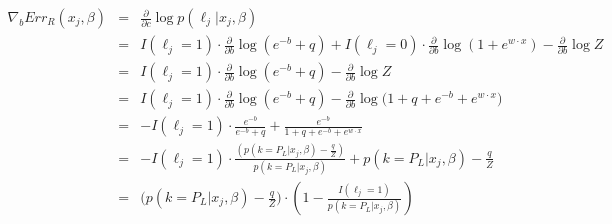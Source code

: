 \documentclass{article}
\begin{document}
\begin{eqnarray*}
\nabla_{b}{Err_R (x_j, \beta)} &=& \frac{\partial}{\partial c}\log{p(\ell_j | x_j, \beta)} \\
&=& I(\ell_j=1) \cdot \frac{\partial}{\partial b}
		\log{(e^{-b} + q)} +
    I(\ell_j=0) \cdot \frac{\partial}{\partial b}
		\log{ \left( 1 + e^{w \cdot x} \right) }
		- \frac{\partial}{\partial b}
		 \log{Z} \\
&=& I(\ell_j=1) \cdot \frac{\partial}{\partial b}
		\log{(e^{-b} + q)} -
		\frac{\partial}{\partial b}
		 \log{Z} \\
 &=& I(\ell_j=1) \cdot \frac{\partial}{\partial b}
		\log{  \left( e^{-b} + q \right) }
		- \frac{\partial}{\partial b}
		 \log{\bigg(
			1 + q + e^{-b} + e^{w \cdot x}
		\bigg)} \\
 &=& - I(\ell_j=1) \cdot
		\frac{e^{-b}}{e^{-b} + q}
		+
		 \frac{e^{-b}}{
			1 + q + e^{-b} + e^{w \cdot x}
		} \\
 &=& - I(\ell_j=1) \cdot
		\frac{ \left( p(k=P_L | x_j,\beta) - \frac{q}{Z} \right) }{p(k=P_L | x_j,\beta)}
		+
		 p(k=P_L | x_j,\beta) - \frac{q}{Z} \\
 &=& \Big( p(k=P_L | x_j,\beta) - \frac{q}{Z} \Big) \cdot \left( 
		1 - \frac{ I(\ell_j=1)}{p(k=P_L | x_j,\beta)}
	  \right) 
\end{eqnarray*}
\end{document}
